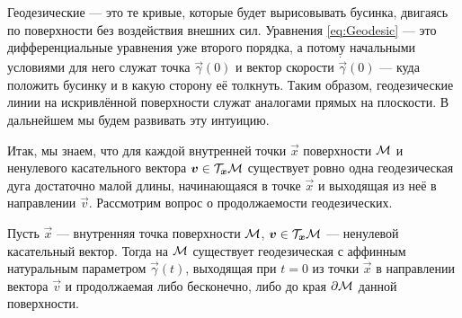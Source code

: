 Геодезические --- это те кривые, которые будет вырисовывать бусинка, двигаясь по поверхности без воздействия внешних сил. Уравнения \eqref{eq:Geodesic} --- это дифференциальные уравнения уже второго порядка, а потому начальными условиями для него служат точка $\vec{\gamma}(0)$ и вектор скорости $\dot{\vec{\gamma}}(0)$ --- куда положить бусинку и в какую сторону её толкнуть. Таким образом, геодезические линии на искривлённой поверхности служат аналогами прямых на плоскости. В дальнейшем мы будем развивать эту интуицию.

Итак, мы знаем, что для каждой внутренней точки $\vec{x}$ поверхности $\mathcal{M}$ и ненулевого касательного вектора $\boldsymbol{v} \in \mathcal{T}_{\boldsymbol{x}}\mathcal{M}$ существует ровно одна геодезическая дуга достаточно малой длины, начинающаяся в точке $\vec{x}$ и выходящая из неё в направлении $\vec{v}$. Рассмотрим вопрос о продолжаемости геодезических.

\begin{theorem}
	Пусть $\vec{x}$ --- внутренняя точка поверхности $\mathcal{M}$, $\boldsymbol{v} \in \mathcal{T}_{\boldsymbol{x}}\mathcal{M}$ --- ненулевой касательный вектор. Тогда на $\mathcal{M}$ существует геодезическая с аффинным натуральным параметром $\vec{\gamma}(t)$, выходящая при $t = 0$ из точки $\vec{x}$ в направлении вектора $\vec{v}$ и продолжаемая либо бесконечно, либо до края $\partial\mathcal{M}$ данной поверхности.
\end{theorem}

